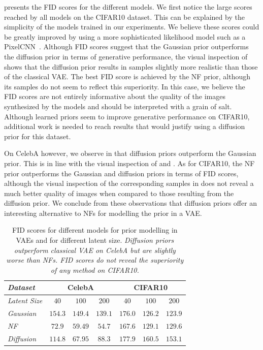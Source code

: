 \documentclass{article}
\newcommand{\tbf}[1]{\textbf{#1}}
\begin{document}
 presents the FID scores for the different models. We first notice the large scores reached by all models on the CIFAR10 dataset. This can be explained by the simplicity of the models trained in our experiments. We believe these scores could be greatly improved by using a more sophisticated likelihood model such as a PixelCNN~\citep{pixelcnn_posterior}. Although FID scores suggest that the Gaussian prior outperforms the diffusion prior in terms of generative performance, the visual inspection of  shows that the diffusion prior results in samples slightly more realistic than those of the classical VAE. The best FID score is achieved by the NF prior, although its samples do not seem to reflect this superiority. In this case, we believe the FID scores are not entirely informative about the quality of the images synthesized by the models and should be interpreted with a grain of salt. Although learned priors seem to improve generative performance on CIFAR10, additional work is needed to reach results that would justify using a diffusion prior for this dataset.

On CelebA however, we observe in  that diffusion priors outperform the Gaussian prior. This is in line with the visual inspection of  and . As for CIFAR10, the NF prior outperforms the Gaussian and diffusion priors in terms of FID scores, although the visual inspection of the corresponding samples in  does not reveal a much better quality of images when compared to those resulting from the diffusion prior. We conclude from these observations that diffusion priors offer an interesting alternative to NFs for modelling the prior in a VAE.

\begin{table}
    \caption{FID scores for different models for prior modelling in VAEs and for different latent size. \textit{Diffusion priors outperform classical VAE on CelebA but are slightly worse than NFs. FID scores do not reveal the superiority of any method on CIFAR10.}}
    \vspace{.5em}
    \label{tab:results}
    \centering
    \small
        \setlength{\tabcolsep}{4pt}

    \begin{tabular}{l | c c c | c c c}
        \hline\hline
        \textit{Dataset} & \multicolumn{3}{c|}{\tbf{CelebA}} & \multicolumn{3}{c}{\tbf{CIFAR10}} \\
        \hline
        \textit{Latent Size} & $40$ & $100$ & $200$ & $40$ & $100$ & $200$ \\ \hline
        \textit{Gaussian} & $154.3$ & $149.4$ & $139.1$ & $176.0$ & $126.2$ & $123.9$ \\ 
        \textit{NF} & $72.9$ & $59.49$ & $54.7$ & $167.6$ & $129.1$ & $129.6$\\ 
        \textit{Diffusion} & $114.8$ & $67.95$ & $88.3$ & $177.9$ & $160.5$ & $153.1$ \\ 
       \hline \hline
    \end{tabular}
\end{table}
\end{document}
